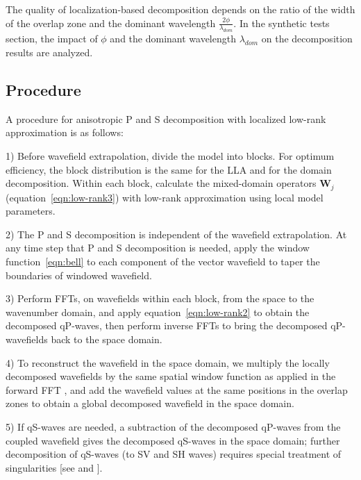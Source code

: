 \documentclass[manuscript,ulem,graphix,revised]{geophysics}
\begin{document}
The quality of localization-based decomposition depends on the ratio of the width of the overlap zone and the dominant wavelength $\frac{2\phi}{\lambda_{dom}}$. In the synthetic tests section, the impact of $\phi$ and the dominant wavelength $\lambda_{dom}$ on the decomposition results are analyzed.

\subsection{Procedure}
\indent\indent
A procedure for anisotropic P and S decomposition with localized low-rank approximation is as follows:
\begin{hangparas}{.25in}{1}

1) Before wavefield extrapolation, divide the model into blocks. For optimum efficiency, the block distribution is the same for the LLA and for the domain decomposition.  Within each block, calculate the mixed-domain operators $\boldsymbol{W}_j$ (equation~\ref{eqn:low-rank3}) with low-rank approximation using local model parameters.

2) 
The P and S decomposition is independent of the wavefield extrapolation. At any time step that P and S decomposition is needed, apply the window function~\ref{eqn:bell} to each component of the vector wavefield to taper the boundaries of windowed wavefield.

3) Perform FFTs, on wavefields within each block, from the space to the wavenumber domain, and apply equation~\ref{eqn:low-rank2} to obtain the decomposed qP-waves, then perform inverse FFTs to bring the decomposed qP-wavefields back to the space domain.


4) To reconstruct the wavefield in the space domain, we multiply the locally decomposed wavefields by the same spatial window function as applied in the forward FFT \citep{crochiere80}, and add the wavefield values at the same positions in the overlap zones to obtain a global decomposed wavefield in the space domain.

5) If qS-waves are needed, a subtraction of the decomposed qP-waves from the coupled wavefield gives the decomposed qS-waves in the space domain; further decomposition of qS-waves (to SV and SH waves) requires special treatment of singularities [see \citet{cheng14} and \citet{Sripanich16}].
\end{hangparas}
\end{document}
